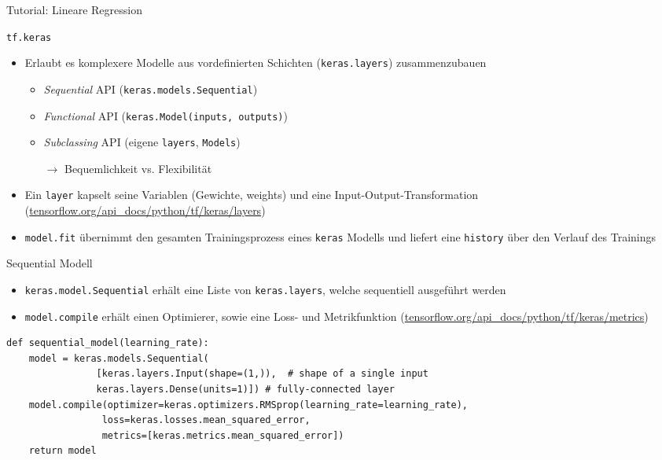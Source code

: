 \documentclass[utf8, smaller, c]{beamer}
\renewcommand{\tt}[1]{{\texttt{#1}}}
\begin{document}
\begin{frame}{Tutorial: Lineare Regression}
	\framebreak
	
	\begin{block}{\tt{tf.keras}}
	    \begin{itemize}
	        \item Erlaubt es komplexere Modelle aus vordefinierten Schichten (\tt{keras.layers}) zusammenzubauen
	        \begin{itemize}
	            \item \textit{Sequential} API (\tt{keras.models.Sequential})
	            \item \textit{Functional} API (\tt{keras.Model(inputs, outputs)})
	            \item \textit{Subclassing} API (eigene \tt{layers}, \tt{Models})
	            \item[$\rightarrow$] Bequemlichkeit vs. Flexibilität
	        \end{itemize}
	        \item Ein \tt{layer} kapselt seine Variablen (Gewichte, weights) und eine Input-Output-Transformation\\ ({\footnotesize\url{tensorflow.org/api_docs/python/tf/keras/layers}})
	        \item \tt{model.fit} übernimmt den gesamten Trainingsprozess eines \tt{keras} Modells und liefert eine \tt{history} über den Verlauf des Trainings
	    \end{itemize}
	\end{block}
	
	\framebreak
	
	\begin{block}{Sequential Modell}
	    \begin{itemize}
	        \item \tt{keras.model.Sequential} erhält eine Liste von \tt{keras.layers}, welche sequentiell ausgeführt werden
	        \item \tt{model.compile} erhält einen Optimierer, sowie eine Loss- und Metrikfunktion ({\footnotesize\url{tensorflow.org/api_docs/python/tf/keras/metrics}})
	    \end{itemize}
	    \begin{lstlisting}
def sequential_model(learning_rate):
    model = keras.models.Sequential(
                [keras.layers.Input(shape=(1,)),  # shape of a single input
                keras.layers.Dense(units=1)]) # fully-connected layer
    model.compile(optimizer=keras.optimizers.RMSprop(learning_rate=learning_rate),
                 loss=keras.losses.mean_squared_error,
                 metrics=[keras.metrics.mean_squared_error])
    return model
	    \end{lstlisting}
	\end{block}
	

\end{frame}
\end{document}
